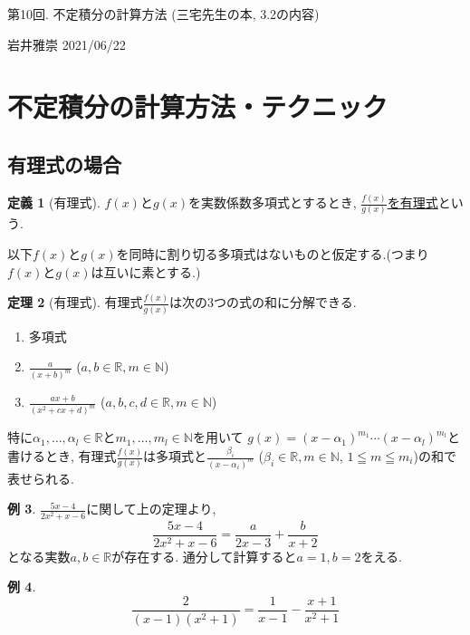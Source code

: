 \documentclass[dvipdfmx,a4paper,11pt]{article}
\newcommand{\R}{\mathbb{R}}
\newcommand{\N}{\mathbb{N}}
\theoremstyle{definition}
\newtheorem{thm}{定理}
\newtheorem{dfn}[thm]{定義}
\newtheorem{exa}[thm]{例}
\begin{document}
\begin{center}
{\Large 第10回. 不定積分の計算方法 (三宅先生の本, 3.2の内容)}
\end{center}

\begin{flushright}
 岩井雅崇 2021/06/22
\end{flushright}


\section{不定積分の計算方法・テクニック}
\subsection{有理式の場合}
 
\begin{tcolorbox}[
    colback = white,
    colframe = green!35!black,
    fonttitle = \bfseries,
    breakable = true]
    \begin{dfn}[有理式]
  $f(x)$と$g(x)$を実数係数多項式とするとき, \underline{$\frac{f(x)}{g(x)}$を有理式}という.
        \end{dfn}
    \end{tcolorbox}

以下$f(x)$と$g(x)$を同時に割り切る多項式はないものと仮定する.(つまり$f(x)$と$g(x)$は互いに素とする.)

\begin{tcolorbox}[
    colback = white,
    colframe = green!35!black,
    fonttitle = \bfseries,
    breakable = true]
    \begin{thm}[有理式]
有理式$\frac{f(x)}{g(x)}$は次の3つの式の和に分解できる.
\begin{enumerate}
\item 多項式
\item $\frac{a}{(x+b)^m}$ ($a,b \in \R, m\in \N$)
\item $\frac{ax + b}{(x^2 + cx +d)^m}$ ($a,b,c,d \in \R, m\in \N$)
\end{enumerate}
特に$\alpha_1, \ldots, \alpha_l \in \R$と$m_1, \ldots, m_l \in \N$を用いて
$g(x) = (x- \alpha_1)^{m_1} \cdots (x- \alpha_l)^{m_l} $と書けるとき, 
有理式$\frac{f(x)}{g(x)}$は多項式と$\frac{\beta_i}{(x- \alpha_i)^m}$ ($\beta_i \in \R, m\in \N$, $1 \leqq m\leqq m_i$)の和で表せられる.
        \end{thm}
    \end{tcolorbox}
\begin{exa}
$\frac{5x -4 }{2x^2 + x -6}$に関して上の定理より, 
$$
\frac{5x -4 }{2x^2 + x -6} = \frac{a}{2x-3} + \frac{b}{x+2}
$$
となる実数$a,b \in \R$が存在する.
通分して計算すると$a=1, b=2$をえる.

\end{exa}
\begin{exa}
$$
\frac{2}{(x-1)(x^2 + 1)} = \frac{1}{x-1} - \frac{x+1}{x^2 + 1}
$$
\end{exa}
\end{document}
